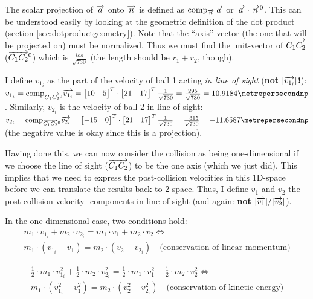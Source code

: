 \documentclass[math,plainoldenumerate,afour]{homework}
\begin{document}
The scalar projection of $\vect{a}$ onto $\vect{n}$ is defined as
$\scalarprojectionof{\vect{a}}{\vect{n}}$ or $\vect{a}\cdot\vect{n}^0$. This
can be understood easily by looking at the geometric definition of the dot
product (section \ref{sec:dotproductgeometry}).  Note that the
``axis''-vector (the one that will be projected on) must be normalized.
Thus we must find the unit-vector of $\los$ ($\los^0$) which is
$\frac{los}{\sqrt{730}}$ (the length should be $r_1 + r_2$, though).

I define $v_{1_i}$ as the part of the velocity of ball 1 acting
\emph{in line of sight} (\textbf{not $\mathbf{|\vonei|}$!}): \\
$v_{1_i} = \scalarprojectionof{\vonei}{\los^0} =
\flatvectortwo{10}{5}\cdot\flatvectortwo{21}{17}\frac{1}{\sqrt{730}} =
\frac{295}{\sqrt{730}} = 10.9184\metrepersecondnp$.
Similarly, $v_{2_i}$ is the velocity of ball 2 in line of sight:
$v_{2_i} = \scalarprojectionof{\vtwoi}{\los^0} =
\flatvectortwo{-15}{0}\cdot\flatvectortwo{21}{17}\frac{1}{\sqrt{730}} =
\frac{-315}{\sqrt{730}} = -11.6587\metrepersecondnp$ (the negative
value is okay since this is a projection).

Having done this, we can now consider the collision as being
one-dimensional if we choose the line of sight ($\los$) to be the one axis
(which we just did). This implies that we need to express the
post-collision velocities in this 1D-space before we can translate the
results back to 2-space. Thus, I define $v_1$ and $v_2$ the post-collision
velocity- components in line of sight (and again: \textbf{not
  $\mathbf{|\vone|/|\vtwo|}$}).

In the one-dimensional case, two conditions hold:
\begin{equation}
  \begin{split}
    m_1\cdot v_{1_i}+m_2\cdot v_{2_i}=
    m_1\cdot v_1+m_2\cdot v_2
    \Leftrightarrow \\
    m_1\cdot\left(v_{1_i}-v_1\right)=
    m_2\cdot\left(v_2-v_{2_i}\right)
    \quad\text{(conservation of linear momentum)}
    \label{eq:conservationoflinmom}
  \end{split}
\end{equation}

\begin{equation}
  \begin{split}
    \frac{1}{2}\cdot m_1\cdot v_{1_i}^2+\frac{1}{2}\cdot m_2\cdot v_{2_i}^2
    =\frac{1}{2}\cdot m_1\cdot v_1^2+\frac{1}{2}\cdot m_2\cdot v_2^2
    \Leftrightarrow \\
    m_1\cdot\left(v_{1_i}^2-v_1^2\right)=
    m_2\cdot\left(v_2^2-v_{2_i}^2\right)
    \quad\text{(conservation of kinetic energy)} 
    \label{eq:conservationofkinenergy}
  \end{split}
\end{equation}
\end{document}
